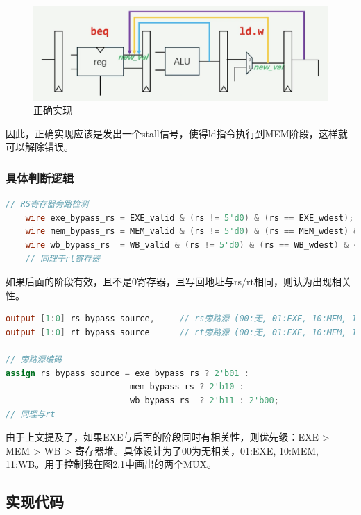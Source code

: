 \documentclass[a4paper]{article}
\begin{document}
\begin{figure}[H]
    \centering
    \includegraphics[width=0.8\linewidth]{img/顺序图片/需要阻塞情况2.png}
    \caption{正确实现}
\end{figure}

因此，正确实现应该是发出一个stall信号，使得ld指令执行到MEM阶段，这样就可以解除错误。

\subsubsection{具体判断逻辑}


\begin{lstlisting}[language=Verilog,caption={是否出现相关性}]
    // RS寄存器旁路检测
    wire exe_bypass_rs = EXE_valid & (rs != 5'd0) & (rs == EXE_wdest);
    wire mem_bypass_rs = MEM_valid & (rs != 5'd0) & (rs == MEM_wdest) & ~exe_bypass_rs;
    wire wb_bypass_rs  = WB_valid & (rs != 5'd0) & (rs == WB_wdest) & ~exe_bypass_rs & ~mem_bypass_rs;
    // 同理于rt寄存器
\end{lstlisting}

如果后面的阶段有效，且不是0寄存器，且写回地址与rs/rt相同，则认为出现相关性。

\begin{lstlisting}[language=Verilog,caption={旁路源编码（优先级检测）}]
output [1:0] rs_bypass_source,     // rs旁路源 (00:无, 01:EXE, 10:MEM, 11:WB)
output [1:0] rt_bypass_source      // rt旁路源 (00:无, 01:EXE, 10:MEM, 11:WB)

// 旁路源编码
assign rs_bypass_source = exe_bypass_rs ? 2'b01 :
                         mem_bypass_rs ? 2'b10 :
                         wb_bypass_rs  ? 2'b11 : 2'b00;
// 同理与rt
\end{lstlisting}

由于上文提及了，如果EXE与后面的阶段同时有相关性，则优先级：EXE > MEM > WB > 寄存器堆。具体设计为了00为无相关，01:EXE, 10:MEM, 11:WB。用于控制我在图2.1中画出的两个MUX。

\newpage

\subsection{实现代码}
\end{document}
